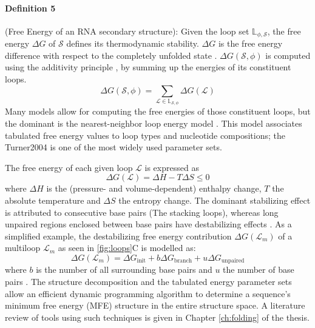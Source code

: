 \paragraph{\textbf{Definition 5}} (Free Energy of an RNA secondary structure): Given the loop set $\mathbb{L}_{\phi, \mathcal{S}}$, the free energy \(\Delta G\) of $\mathcal{S}$ defines its thermodynamic stability. \(\Delta G\) is the free energy difference with respect to the completely unfolded state \cite{tinoco_estimation_1971}. \(\Delta G (\mathcal{S}, \phi)\) is computed using the additivity principle \cite{dill97_addit_princ_bioch}, by summing up the energies of its constituent loops.
\begin{equation}
	 \Delta G(\mathcal{S}, \phi) = \sum_{\mathcal{L}\in \mathbb{L}_{\mathcal{S}, \phi}}{ \Delta G(\mathcal{L}) }
\end{equation}
Many models allow for computing the free energies of those constituent loops, but the dominant is the nearest-neighbor loop energy model \cite{turner09_nndb}. This model associates tabulated free energy values to loop types and nucleotide compositions; the Turner2004 \cite{mathews2004incorporating} is one of the most widely used parameter sets. 

The free energy of each given loop $\mathcal{L}$ is expressed as
\begin{equation}\label{eq:gibbs}
\Delta G (\mathcal{L}) = \Delta H - T \Delta S \leq 0
\end{equation}
where $\Delta H$ is the (pressure- and volume-dependent) enthalpy change, $T$ the absolute temperature and $\Delta S$ the entropy change. 
The dominant stabilizing effect is attributed to consecutive base pairs (The stacking loops), whereas long unpaired regions enclosed between base pairs have destabilizing effects \cite{fresco_molecular_1960, hofacker_rna_2006}. As a simplified example, the destabilizing free energy contribution $\Delta G(\mathcal{L}_m)$ of a multiloop $\mathcal{L}_m$  as seen in \ref{fig:loops}C is modelled as:
\begin{equation}\label{eq:multi}
\Delta G(\mathcal{L}_m) = \Delta G_\mathrm{init} + b \Delta G_\mathrm{branch} + u \Delta G_\mathrm{unpaired}
\end{equation}
where $b$ is the number of all surrounding base pairs and $u$ the number of base pairs \parencite{dirks_partition_2003}.
The structure decomposition and the tabulated energy parameter sets allow an efficient dynamic programming algorithm to determine a sequence's minimum free energy (MFE) structure in the entire structure space. A literature review of tools using such techniques is given in Chapter \ref{ch:folding} of the thesis.
